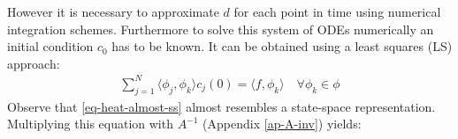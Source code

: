 However it is necessary to approximate \(d\) for each point in time using numerical integration schemes.
Furthermore to solve this system of ODEs numerically an initial condition \(c_{0}\) has to be known.
\cite{Gustafsson2011b}
It can be obtained using a least squares (LS) approach:
\begin{gather}
\sum_{j = 1}^N \langle \phi_j, \phi_k \rangle c_{j}(0) = \langle f, \phi_{k} \rangle \quad \forall \phi_k \in \phi
\end{gather}
\cite{Gustafsson2011c}
Observe that \ref{eq-heat-almost-ss} almost resembles a state-space representation.
Multiplying this equation with \(A^{-1}\) (Appendix \ref{ap-A-inv}) yields:



